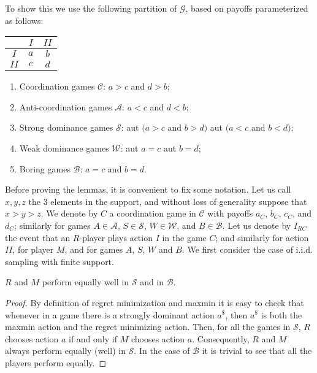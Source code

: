 \documentclass[fleqn,reqno,11pt]{article}
\begin{document}
\noindent To show this we use the following partition of $\mathcal{G}$, based on payoffs parameterized as
follows:
\begin{center}
  \begin{tabular}{ccc}
    \toprule
    & $I$ & $II$ \\ \midrule
    $I$ & $a$ & $b$ \\
    $II$ & $c$ & $d$ \\ \bottomrule
  \end{tabular}
\end{center}
\begin{enumerate}
\item Coordination games $\mathcal{C}$: $a>c$ and $d>b$;
\item Anti-coordination games $\mathcal{A}$: $a<c$ and $d<b$;
\item Strong dominance games $\mathcal{S}$: aut $(a>c$ and $b>d)$
aut $(a<c$ and $b<d)$;
\item Weak dominance games $\mathcal{W}$: aut $a=c$ aut $b=d$;
\item Boring games $\mathcal{B}$: $a=c$ and $b=d$.
\end{enumerate}
Before proving the lemmas, it is convenient to fix some notation. Let us call $x,y,z$ the 3
elements in the support, and without loss of generality suppose that $ x > y > z $.  We denote
by $C$ a coordination game in $\mathcal{C}$ with payoffs $a_{C}$, $b_{C}$, $c_{C}$, and
$d_{C}$; similarly for games $A \in \mathcal{A}$, $S \in \mathcal{S}$, $W \in \mathcal{W}$, and
$B \in \mathcal{B}$.  Let us denote by $I_{RC}$ the event that an $R$-player plays action $I$ in
the game $C$; and similarly for action $II$, for player $M$, and for games $A$, $S$, $W$ and
$B$. We first consider the case of i.i.d. sampling with finite support.

\begin{lemma} \label{lemma:S-B games} $R$ and $M$ perform equally well in $\mathcal{S}$ and in
  $\mathcal{B}$.
\end{lemma}

\begin{proof}
  By definition of regret minimization and maxmin it is easy to check that whenever in a game
  there is a strongly dominant action $a^{\$}$, then $a^{\$}$ is both the maxmin action and the
  regret minimizing action. Then, for all the games in $\mathcal{S}$, $R$ chooses action $a$ if
  and only if $M$ chooses action $a$. Consequently, $R$ and $M$ always perform equally (well)
  in $\mathcal{S}$. In the case of $\mathcal{B}$ it is trivial to see that all the players
  perform equally.
\end{proof}
\end{document}
